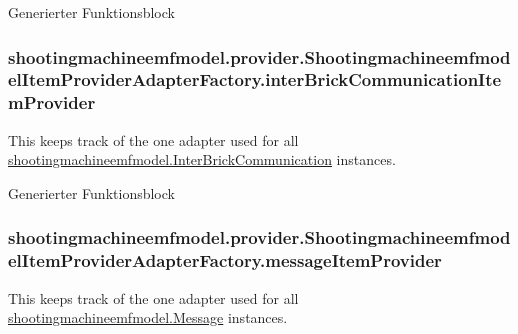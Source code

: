 Generierter Funktionsblock \hypertarget{classshootingmachineemfmodel_1_1provider_1_1_shootingmachineemfmodel_item_provider_adapter_factory_a6b84862a84bce45f885fda3005d52b20}{
\subsubsection[{inter\-Brick\-Communication\-Item\-Provider}]{ shootingmachineemfmodel.\-provider.\-Shootingmachineemfmodel\-Item\-Provider\-Adapter\-Factory.\-inter\-Brick\-Communication\-Item\-Provider\hspace{0.3cm}{\ttfamily [protected]}}}\label{classshootingmachineemfmodel_1_1provider_1_1_shootingmachineemfmodel_item_provider_adapter_factory_a6b84862a84bce45f885fda3005d52b20}
This keeps track of the one adapter used for all \hyperlink{interfaceshootingmachineemfmodel_1_1_inter_brick_communication}{shootingmachineemfmodel.\-Inter\-Brick\-Communication} instances.

Generierter Funktionsblock \hypertarget{classshootingmachineemfmodel_1_1provider_1_1_shootingmachineemfmodel_item_provider_adapter_factory_a5abcc88127ed58f98c7e73dcb79a4a80}{
\subsubsection[{message\-Item\-Provider}]{ shootingmachineemfmodel.\-provider.\-Shootingmachineemfmodel\-Item\-Provider\-Adapter\-Factory.\-message\-Item\-Provider\hspace{0.3cm}{\ttfamily [protected]}}}\label{classshootingmachineemfmodel_1_1provider_1_1_shootingmachineemfmodel_item_provider_adapter_factory_a5abcc88127ed58f98c7e73dcb79a4a80}
This keeps track of the one adapter used for all \hyperlink{interfaceshootingmachineemfmodel_1_1_message}{shootingmachineemfmodel.\-Message} instances.


